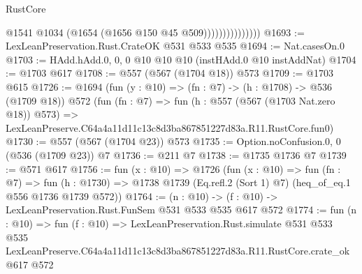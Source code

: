 \begin{lexlean}{RustCore}
\begin{coremodule}
                              @1541
                              @1034
                              (@1654 (@1656 @150 @45 @509)))))))))))))))
@1693 := LexLeanPreservation.Rust.CrateOK @531 @533 @535
@1694 := Nat.casesOn.{0}
@1703 := HAdd.hAdd.{0, 0, 0} @10 @10 @10 (instHAdd.{0} @10 instAddNat)
@1704 := @1703 @617
@1708 := @557 (@567 (@1704 @18)) @573
@1709 := @1703 @615
@1726 := @1694
    (fun (y : @10) => (fn : @7) -> (h : @1708) -> @536 (@1709 @18))
    @572
    (fun (fn : @7) =>
    fun (h : @557 (@567 (@1703 Nat.zero @18)) @573) =>
    LexLeanPreserve.C64a4a11d11c13c8d3ba867851227d83a.R11.RustCore.fun0)
@1730 := @557 (@567 (@1704 @23)) @573
@1735 := Option.noConfusion.{0, 0} (@536 (@1709 @23)) @7
@1736 := @211 @7
@1738 := @1735 @1736 @7
@1739 := @571 @617
@1756 := fun (x : @10) =>
  @1726
    (fun (x : @10) =>
    fun (fn : @7) =>
    fun (h : @1730) => @1738 @1739 (Eq.refl.{2} (Sort 1) @7) (heq_of_eq.{1} @556 @1736 @1739 @572))
@1764 := (n : @10) -> (f : @10) -> LexLeanPreservation.Rust.FunSem @531 @533 @535 @617 @572
@1774 := fun (n : @10) =>
  fun (f : @10) =>
  LexLeanPreservation.Rust.simulate
    @531
    @533
    @535
    LexLeanPreserve.C64a4a11d11c13c8d3ba867851227d83a.R11.RustCore.crate_ok
    @617
    @572
\end{coremodule}
\end{lexlean}
